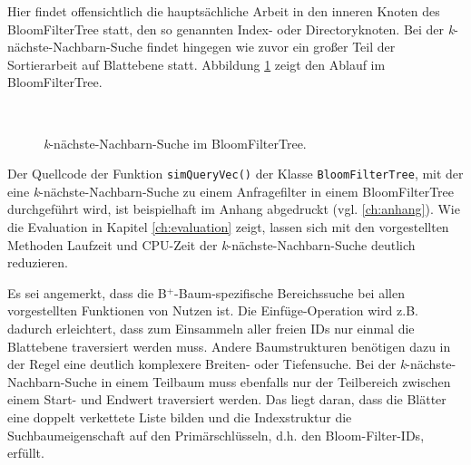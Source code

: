 Hier findet offensichtlich die hauptsächliche Arbeit in den inneren Knoten des BloomFilterTree statt, den so genannten Index- oder Directoryknoten. Bei der \textit{k}-nächste-Nachbarn-Suche findet hingegen wie zuvor ein großer Teil der Sortierarbeit auf Blattebene statt. Abbildung \ref{fig:knn} zeigt den Ablauf im BloomFilterTree.
\begin{figure}[hpbt]
  \centering
  \\
  \caption[\textit{k}-nächste-Nachbarn-Suche im BloomFilterTree]{\textit{k}-nächste-Nachbarn-Suche im BloomFilterTree.}\label{fig:knn}
\end{figure}
Der Quellcode der Funktion \mbox{\texttt{simQueryVec()}} der Klasse \texttt{BloomFilterTree}, mit der eine \textit{k}-nächste-Nachbarn-Suche zu einem Anfragefilter in einem BloomFilterTree durchgeführt wird, ist beispielhaft im Anhang abgedruckt (vgl. \ref{ch:anhang}). Wie die Evaluation in Kapitel \ref{ch:evaluation} zeigt, lassen sich mit den vorgestellten Methoden Laufzeit und CPU-Zeit der \textit{k}-nächste-Nachbarn-Suche deutlich reduzieren. 

Es sei angemerkt, dass die B$^+$-Baum-spezifische Bereichssuche bei allen vorgestellten Funktionen von Nutzen ist. Die Einfüge-Operation wird z.B. dadurch erleichtert, dass zum Einsammeln aller freien IDs nur einmal die Blattebene traversiert werden muss. Andere Baumstrukturen benötigen dazu in der Regel eine deutlich komplexere Breiten- oder Tiefensuche. Bei der \textit{k}-nächste-Nachbarn-Suche in einem Teilbaum muss ebenfalls nur der Teilbereich zwischen einem Start- und Endwert traversiert werden. Das liegt daran, dass die Blätter eine doppelt verkettete Liste bilden und die Indexstruktur die Suchbaumeigenschaft auf den Primärschlüsseln, d.h. den Bloom-Filter-IDs, erfüllt.  
